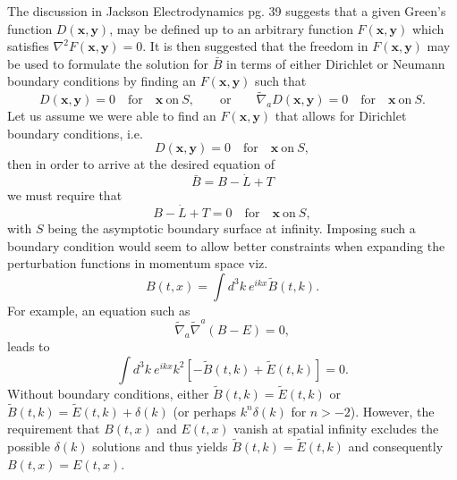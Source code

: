 \documentclass[10pt,letterpaper]{article}
\numberwithin{equation}{subsection}
\begin{document}
The discussion in Jackson Electrodynamics pg. 39 suggests that a given Green's function $D(\mathbf x, \mathbf y)$, may be defined up to an arbitrary function 
$F(\mathbf x, \mathbf y)$ which satisfies $\nabla^2 F(\mathbf x, \mathbf y) = 0$. It is then suggested that the freedom in $F(\mathbf x, \mathbf y)$ may be used to formulate the solution for $\bar B$ in terms of either Dirichlet or Neumann boundary conditions by finding an $F(\mathbf x, \mathbf y)$ such that
\begin{equation}
D(\mathbf x, \mathbf y) = 0\quad\text{for}\quad \mathbf x\ \text{on}\ S,\qquad \text{or}\qquad \tilde\nabla_a D(\mathbf x, \mathbf y) = 0\quad\text{for}\quad \mathbf x\ \text{on}\ S.
\end{equation}
Let us assume we were able to find an $F(\mathbf x,\mathbf y)$ that allows for Dirichlet boundary conditions, i.e.
\begin{equation}
D(\mathbf x, \mathbf y) = 0\quad\text{for}\quad \mathbf x\ \text{on}\ S,
\end{equation}
then in order to arrive at the desired equation of
\begin{equation}
\bar B = B - \dot L + T
\end{equation}
we must require that 
\begin{equation}
B - \dot L + T = 0\quad\text{for}\quad \mathbf x\ \text{on}\ S,
\end{equation}
with $S$ being the asymptotic boundary surface at infinity. Imposing such a boundary condition would seem to allow better constraints when expanding the perturbation functions in momentum space viz.
\begin{equation}
B(t,x) = \int d^3k\ e^{ikx} \tilde B(t,k).
\end{equation}
For example, an equation such as
\begin{equation}
\tilde\nabla_a \tilde\nabla^a (B-E) = 0,
\end{equation}
leads to
\begin{equation}
\int d^3k\ e^{ikx} k^2 [-\tilde B(t,k)+\tilde E(t,k)] = 0.
\end{equation}
Without boundary conditions, either $\tilde B(t,k) = \tilde E(t,k)$ or $\tilde B(t,k)=\tilde E(t,k)+\delta(k)$ (or perhaps $k^n \delta(k)$ for $n>-2$). However, the requirement that $B(t,x)$ and $E(t,x)$ vanish at spatial infinity excludes the possible $\delta(k)$ solutions and thus yields $\tilde B(t,k) = \tilde E(t,k)$ and consequently $B(t,x) = E(t,x)$.
\\ \\
\end{document}
